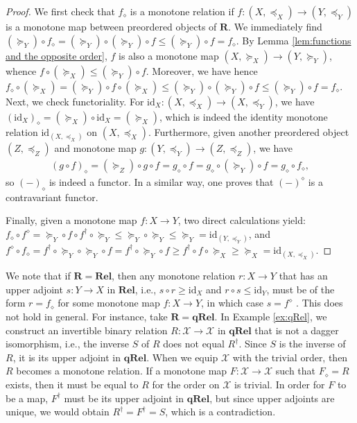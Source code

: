 \documentclass[12pt]{tac}
\theoremstyle{definition}
\theoremstyle{remark}
\newcommand{\X}{\mathcal X}
\newcommand{\qo}{{\boldsymbol{\preccurlyeq}}}
\newcommand{\qop}{{\boldsymbol{\succcurlyeq}}}
\newcommand{\<}{\langle}
\renewcommand{\>}{\rangle}
\renewcommand{\:}{\colon}
\newcommand{\id}{\mathrm{id}}
\begin{document}
\begin{proof}
We first check that $f_\diamond$ is a monotone relation if $f:(X,\qo_X)\to(Y,\qo_Y)$ is a monotone map between preordered objects of $\mathbf R$. We immediately find     
    $(\qop_Y)\circ f_\diamond = (\qop_Y)\circ (\qop_Y)\circ f\leq (\qop_Y)\circ f=f_\diamond$. By Lemma \ref{lem:functions and the opposite order}, $f$ is also a monotone map $(X,\qop_X)\to(Y,\qop_Y)$, whence $f\circ (\qop_X)\leq (\qop_Y)\circ f$. 
Moreover, we have
hence $f_\diamond\circ (\qop_X)=(\qop_Y)\circ f\circ (\qop_X)\leq (\qop_Y)\circ (\qop_Y)\circ f\leq (\qop_Y)\circ f=f_\diamond$.
Next, we check functoriality. For  $\id_X:(X,\qo_X)\to(X,\qo_Y)$, we have $(\id_X)_\diamond=(\qop_X)\circ \id_X=(\qop_X)$, which is indeed the identity monotone relation $\id_{(X,\qo_X)}$ on $(X,\qo_X)$. Furthermore, given another preordered object $(Z,\qo_Z)$ and monotone map $g:(Y,\qo_Y)\to(Z,\qo_Z)$, we have 
\begin{align*}
    (g\circ f)_\diamond= (\qop_Z)\circ g\circ f=g_\diamond\circ f=g_\diamond\circ (\qop_Y)\circ f=g_\diamond\circ f_\diamond,
\end{align*}
so $(-)_\diamond$ is indeed a functor. In a similar way, one proves that $(-)^\diamond$ is a contravariant functor.

Finally, given a monotone map $f:X\to Y$, two direct calculations yield:  
$f_\diamond\circ f^\diamond =\qop_Y\circ f\circ f^\dag\circ \qop_Y\leq \qop_Y\circ \qop_Y\leq \qop_Y=\id_{(Y,\qo_Y)}$, and
$f^\diamond\circ f_\diamond= f^\dag\circ \qop_Y\circ \qop_Y\circ f=f^\dag\circ \qop_Y\circ f\geq f^\dag\circ f\circ \qop_X\geq \qop_X=\id_{(X,\qo_X)}$. 
\end{proof}

We note that if $\mathbf{R}=\mathbf{Rel}$, then any monotone relation $r:X\to Y$ that has an upper adjoint $s:Y\to X$ in $\mathbf{Rel}$, i.e., $s\circ r\geq \id_X$ and $r\circ s\leq \id_Y$, must be of the form $r=f_\diamond$ for some monotone map $f:X\to Y$, in which case $s=f^\diamond$ \cite[Footnote 3]{KurzMoshierJung}. This does not hold in general. For instance, take $\mathbf{R}=\mathbf{qRel}$. In Example \ref{ex:qRel}, we construct an invertible binary relation $R:\X\to\X$ in $\mathbf{qRel}$ that is not a dagger isomorphism, i.e., the inverse $S$ of $R$ does not equal $R^\dag$. Since $S$ is the inverse of $R$, it is its upper adjoint in $\mathbf{qRel}$. When we equip $\X$ with the trivial order, then $R$ becomes a monotone relation. If a monotone map $F:\X\to\X$ such that $F_\diamond=R$ exists, then it must be equal to $R$ for the order on $\X$ is trivial. In order for $F$ to be a map, $F^\dag$ must be its upper adjoint in $\mathbf{qRel}$, but since upper adjoints are unique, we would obtain $R^\dag=F^\dag=S$, which is a contradiction. 
\end{document}
